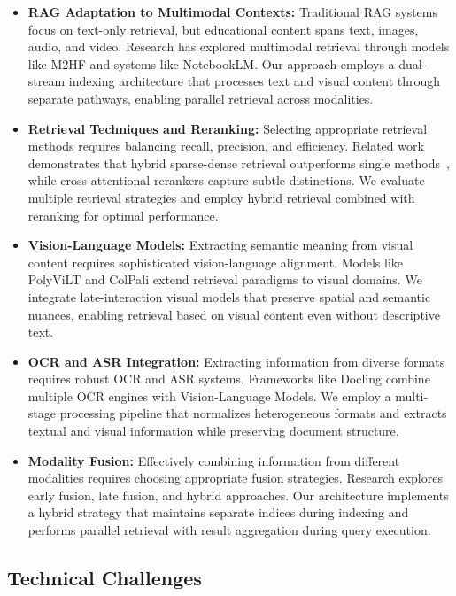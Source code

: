 \begin{itemize}
    \item \textbf{RAG Adaptation to Multimodal Contexts:} Traditional RAG systems focus on text-only retrieval, but educational content spans text, images, audio, and video. Research has explored multimodal retrieval through models like M2HF and systems like NotebookLM. Our approach employs a dual-stream indexing architecture that processes text and visual content through separate pathways, enabling parallel retrieval across modalities.
    
    \item \textbf{Retrieval Techniques and Reranking:} Selecting appropriate retrieval methods requires balancing recall, precision, and efficiency. Related work demonstrates that hybrid sparse-dense retrieval outperforms single methods~\cite{luan2021sparse_dense}, while cross-attentional rerankers capture subtle distinctions. We evaluate multiple retrieval strategies and employ hybrid retrieval combined with reranking for optimal performance.
    
    \item \textbf{Vision-Language Models:} Extracting semantic meaning from visual content requires sophisticated vision-language alignment. Models like PolyViLT and ColPali extend retrieval paradigms to visual domains. We integrate late-interaction visual models that preserve spatial and semantic nuances, enabling retrieval based on visual content even without descriptive text.
    
    \item \textbf{OCR and ASR Integration:} Extracting information from diverse formats requires robust OCR and ASR systems. Frameworks like Docling combine multiple OCR engines with Vision-Language Models. We employ a multi-stage processing pipeline that normalizes heterogeneous formats and extracts textual and visual information while preserving document structure.
    
    \item \textbf{Modality Fusion:} Effectively combining information from different modalities requires choosing appropriate fusion strategies. Research explores early fusion, late fusion, and hybrid approaches. Our architecture implements a hybrid strategy that maintains separate indices during indexing and performs parallel retrieval with result aggregation during query execution.
\end{itemize}

\subsection*{Technical Challenges}

